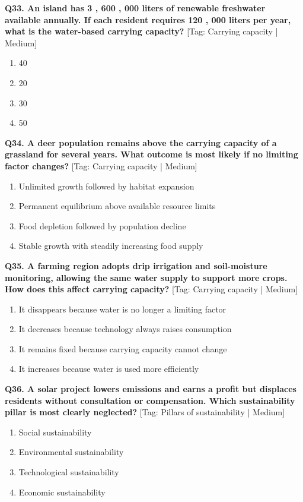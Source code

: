 \noindent\textbf{Q33. An island has 3 , 600 , 000 liters of renewable freshwater available annually. If each resident requires 120 , 000 liters per year, what is the water-based carrying capacity?} \hfill [Tag: Carrying capacity | Medium]
\begin{enumerate}[label=(\alph*),topsep=2pt,itemsep=1pt,partopsep=0pt,parsep=0pt]
    \item {40}
    \item {20}
    \item {30}
    \item {50}
\end{enumerate}
\vspace{2mm}

\noindent\textbf{Q34. A deer population remains above the carrying capacity of a grassland for several years. What outcome is most likely if no limiting factor changes?} \hfill [Tag: Carrying capacity | Medium]
\begin{enumerate}[label=(\alph*),topsep=2pt,itemsep=1pt,partopsep=0pt,parsep=0pt]
    \item {Unlimited growth followed by habitat expansion}
    \item {Permanent equilibrium above available resource limits}
    \item {Food depletion followed by population decline}
    \item {Stable growth with steadily increasing food supply}
\end{enumerate}
\vspace{2mm}

\noindent\textbf{Q35. A farming region adopts drip irrigation and soil-moisture monitoring, allowing the same water supply to support more crops. How does this affect carrying capacity?} \hfill [Tag: Carrying capacity | Medium]
\begin{enumerate}[label=(\alph*),topsep=2pt,itemsep=1pt,partopsep=0pt,parsep=0pt]
    \item {It disappears because water is no longer a limiting factor}
    \item {It decreases because technology always raises consumption}
    \item {It remains fixed because carrying capacity cannot change}
    \item {It increases because water is used more efficiently}
\end{enumerate}
\vspace{2mm}

\noindent\textbf{Q36. A solar project lowers emissions and earns a profit but displaces residents without consultation or compensation. Which sustainability pillar is most clearly neglected?} \hfill [Tag: Pillars of sustainability | Medium]
\begin{enumerate}[label=(\alph*),topsep=2pt,itemsep=1pt,partopsep=0pt,parsep=0pt]
    \item {Social sustainability}
    \item {Environmental sustainability}
    \item {Technological sustainability}
    \item {Economic sustainability}
\end{enumerate}
\vspace{2mm}

